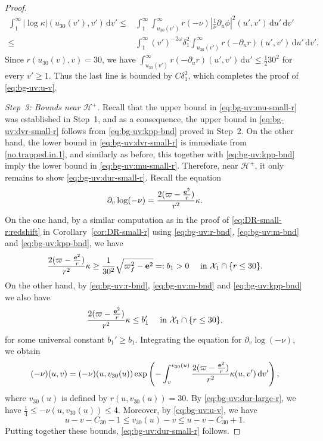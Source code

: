 \documentclass[10pt, reqno]{amsart}
\theoremstyle{definition}
\theoremstyle{remark}
\theoremstyle{conjecture}
\numberwithin{equation}{section}
\newcommand{\abs}[1]{\vert#1\vert}
\newcommand{\set}[1]{\{#1\}}
\newcommand{\ud}{\mathrm{d}}
\newcommand{\rd}{\partial}
\newcommand{\0}{\emptyset}
\newcommand{\dlt}{\delta}
\newcommand{\kpp}{\kappa}
\newcommand{\omg}{\omega}
\newcommand{\bfe}{{\bf e}}
\newcommand{\calH}{\mathcal H}
\newcommand{\calX}{\mathcal X}
\newcommand{\dur}{\nu}
\newcommand{\EH}{\calH^{+}}
\newcommand{\pfstep}[1]{\vspace{.5em} {\it \noindent #1.}}
\newcommand{\e}{\bfe}							%
\newcommand{\Abs}[1]{\left\vert #1 \right\vert}
\begin{document}
\begin{proof}
\begin{align*}
	\int_{1}^{\infty} \abs{\log \kpp} (u_{30}(v'), v') \, \ud v' 
	\leq & \int_{1}^{\infty} \int_{u_{30}(v')}^{\infty} r (-\dur) \Abs{\frac{1}{\dur} \rd_{u} \phi}^{2}(u', v') \, \ud u' \, \ud v' \\
	\leq & \int_{1}^{\infty} (v')^{-2\omg} \dlt_{1}^{2} \int_{u_{30}(v')}^{\infty} r (-\rd_{u} r) (u', v') \, \ud u' \, \ud v' .
\end{align*}
Since $r(u_{30}(v), v) = 30$, we have $\int_{u_{30}(v')}^{\infty} r(-\rd_{u} r)(u', v') \, \ud u' \leq \frac{1}{2} 30^{2}$ for every $v' \geq 1$. Thus the last line is bounded by $C \dlt_{1}^{2}$, which completes the proof of \eqref{eq:bg-uv:u-v}.

\pfstep{Step~3: Bounds near $\EH$}
Recall that the upper bound in \eqref{eq:bg-uv:mu-small-r} was established in Step~1, and as a consequence, the upper bound in \eqref{eq:bg-uv:dvr-small-r} follows from \eqref{eq:bg-uv:kpp-bnd} proved in Step~2. On the other hand, the lower bound in \eqref{eq:bg-uv:dvr-small-r} is immediate from \eqref{no.trapped.in.1}, and similarly as before, this together with \eqref{eq:bg-uv:kpp-bnd} imply the lower bound in \eqref{eq:bg-uv:mu-small-r}. Therefore, near $\EH$, it only remains to show \eqref{eq:bg-uv:dur-small-r}.
Recall the equation
\begin{equation*}
	\rd_{v} \log (-\dur) = \frac{2 (\varpi - \frac{\e^{2}}{r})}{r^{2}} \kpp.
\end{equation*}
On the one hand, by a similar computation as in the proof of \eqref{eq:DR-small-r:redshift} in Corollary~\ref{cor:DR-small-r} using \eqref{eq:bg-uv:r-bnd}, \eqref{eq:bg-uv:m-bnd} and \eqref{eq:bg-uv:kpp-bnd}, we have
\begin{equation*}
\frac{2 (\varpi - \frac{\e^{2}}{r})}{r^{2}} \kpp \geq \frac{1}{30^{2}}\sqrt{\varpi_{f}^{2} - \e^{2}} =: b_{1} > 0 \quad \hbox{ in } \calX_{1} \cap \set{r \leq 30}.
\end{equation*}
On the other hand, by \eqref{eq:bg-uv:r-bnd}, \eqref{eq:bg-uv:m-bnd} and \eqref{eq:bg-uv:kpp-bnd} we also have
\begin{equation*}
\frac{2 (\varpi - \frac{\e^{2}}{r})}{r^{2}} \kpp \leq b_{1}' \quad \hbox{ in } \calX_{1} \cap \set{r \leq 30},
\end{equation*}
for some universal constant $b_{1}' \geq b_{1}$. Integrating the equation for $\rd_{v} \log (-\dur)$, we obtain
\begin{align*}
	(-\dur)(u, v) = (-\dur)(u, v_{30}(u)) \exp \left( - \int_{v}^{v_{30}(u)} \frac{2 (\varpi - \frac{\e^{2}}{r})}{r^{2}} \kpp (u, v') \, \ud v' \right),
\end{align*}
where $v_{30}(u)$ is defined by $r(u, v_{30}(u)) = 30$. By \eqref{eq:bg-uv:dur-large-r}, we have $\frac{1}{4} \leq -\dur(u, v_{30}(u)) \leq 4$. Moreover, by \eqref{eq:bg-uv:u-v}, we have
\begin{equation*}
	u - v - C_{30} -1 \leq v_{30}(u) - v \leq u - v - C_{30} + 1.
\end{equation*}
Putting together these bounds, \eqref{eq:bg-uv:dur-small-r} follows.


\end{proof}
\end{document}
